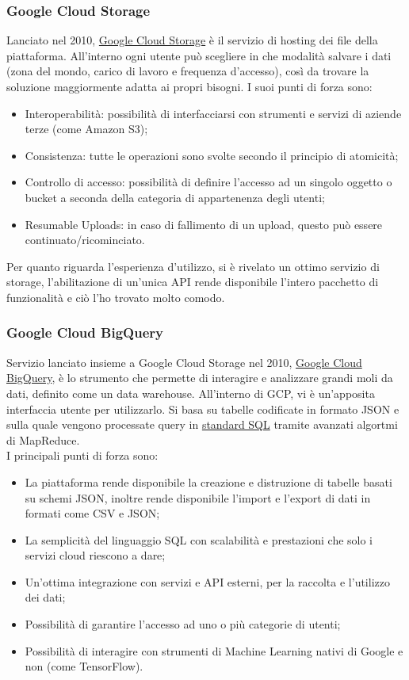 \subsubsection{Google Cloud Storage}
Lanciato nel 2010, \href{https://cloud.google.com/storage/}{Google Cloud Storage} è il servizio di hosting dei file della piattaforma. All'interno ogni utente può scegliere in che modalità salvare i dati (zona del mondo, carico di lavoro e frequenza d'accesso), così da trovare la soluzione maggiormente adatta ai propri bisogni.
I suoi punti di forza sono:
\begin{itemize}
	\item Interoperabilità: possibilità di interfacciarsi con strumenti e servizi di aziende terze (come Amazon S3);
	\item Consistenza: tutte le operazioni sono svolte secondo il principio di \gls{atomicità};
	\item Controllo di accesso: possibilità di definire l'accesso ad un singolo oggetto o \gls{bucket} a seconda della categoria di appartenenza degli utenti;
	\item Resumable Uploads: in caso di fallimento di un upload, questo può essere continuato/ricominciato.
\end{itemize}

Per quanto riguarda l'esperienza d'utilizzo, si è rivelato un ottimo servizio di storage, l'abilitazione di un'unica API rende disponibile l'intero pacchetto di funzionalità e ciò l'ho trovato molto comodo.
\subsubsection{Google Cloud BigQuery}
Servizio lanciato insieme a Google Cloud Storage nel 2010, \href{https://cloud.google.com/bigquery/}{Google Cloud BigQuery}, è lo strumento che permette di interagire e analizzare grandi moli da dati, definito come un \gls{data warehouse}. All'interno di GCP, vi è un'apposita interfaccia utente per utilizzarlo. Si basa su tabelle codificate in formato JSON e sulla quale vengono processate query in \href{https://cloud.google.com/bigquery/docs/reference/standard-sql/enabling-standard-sql}{standard SQL} tramite avanzati algortmi di \gls{MapReduce}.
\\I principali punti di forza sono:
\begin{itemize}
	\item La piattaforma rende disponibile la creazione e distruzione di tabelle basati su schemi JSON, inoltre rende disponibile l'import e l'export di dati in formati come CSV e JSON;
	\item La semplicità del linguaggio SQL con scalabilità e prestazioni che solo i servizi cloud riescono a dare;
	\item Un'ottima integrazione con servizi e API esterni, per la raccolta e l'utilizzo dei dati;
	\item Possibilità di garantire l'accesso ad uno o più categorie di utenti;
	\item Possibilità di interagire con strumenti di Machine Learning nativi di Google e non (come TensorFlow).
\end{itemize}

